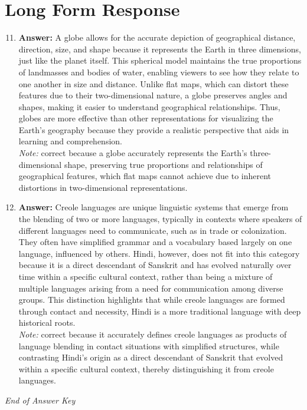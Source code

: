 \documentclass[12pt]{article}
\begin{document}
\section*{Long Form Response}
\begin{enumerate}[label=\arabic*.]
\setcounter{enumi}{10}
\item \textbf{Answer:} A globe allows for the accurate depiction of geographical distance, direction, size, and shape because it represents the Earth in three dimensions, just like the planet itself. This spherical model maintains the true proportions of landmasses and bodies of water, enabling viewers to see how they relate to one another in size and distance. Unlike flat maps, which can distort these features due to their two-dimensional nature, a globe preserves angles and shapes, making it easier to understand geographical relationships. Thus, globes are more effective than other representations for visualizing the Earth's geography because they provide a realistic perspective that aids in learning and comprehension.
\\ \textit{Note:} correct because a globe accurately represents the Earth's three-dimensional shape, preserving true proportions and relationships of geographical features, which flat maps cannot achieve due to inherent distortions in two-dimensional representations.
\item \textbf{Answer:} Creole languages are unique linguistic systems that emerge from the blending of two or more languages, typically in contexts where speakers of different languages need to communicate, such as in trade or colonization. They often have simplified grammar and a vocabulary based largely on one language, influenced by others. Hindi, however, does not fit into this category because it is a direct descendant of Sanskrit and has evolved naturally over time within a specific cultural context, rather than being a mixture of multiple languages arising from a need for communication among diverse groups. This distinction highlights that while creole languages are formed through contact and necessity, Hindi is a more traditional language with deep historical roots.
\\ \textit{Note:} correct because it accurately defines creole languages as products of language blending in contact situations with simplified structures, while contrasting Hindi's origin as a direct descendant of Sanskrit that evolved within a specific cultural context, thereby distinguishing it from creole languages.
\end{enumerate}

\vfill
\noindent\textit{End of Answer Key}
\end{document}
